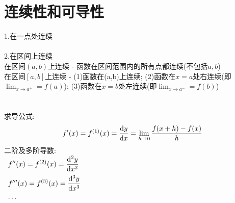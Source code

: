 \chapter{连续性和可导性}
1.在一点处连续\\[1ex]
\\[4ex]
2.在区间上连续\\
在区间$(a,b)$上连续 - 函数在区间范围内的所有点都连续(不包括$a,b$)\\
在区间$[a,b]$上连续 - (1)函数在(a,b)上连续; (2)函数在$x=a$处右连续(即$\displaystyle\lim_{x\to a^+}=f(a)$); (3)函数在$x=b$处左连续(即$\displaystyle\lim_{x\to a^-}=f(b)$)\\[4ex]
\\[4ex]
\\[4ex]
求导公式:
\[f'(x)=f^{(1)}(x)=\frac{\mathop{}\!\mathrm{d} y}{\mathop{}\!\mathrm{d} x}=\lim_{h\to 0}\frac{f(x+h)-f(x)}{h}\]
二阶及多阶导数:\\
\begin{math}
\begin{array}{l}
	\displaystyle f''(x)=f^{(2)}(x)=\frac{\mathop{}\!\mathrm{d}^2y}{\mathop{}\!\mathrm{d} x^2}\\[2ex]
	\displaystyle f'''(x)=f^{(3)}(x)=\frac{\mathop{}\!\mathrm{d}^3y}{\mathop{}\!\mathrm{d} x^3}\\[2ex]
	\cdots
\end{array}
\end{math}\\[2ex]

